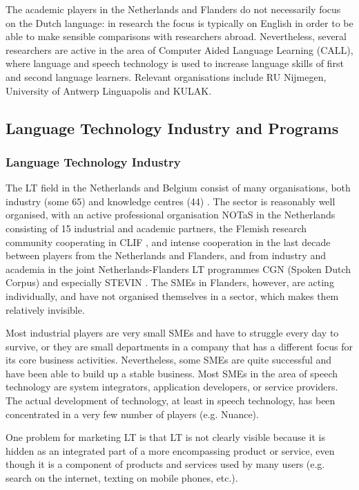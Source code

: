 \documentclass[]{../../metanetpaper}
\begin{document}
\begin{multicols}{2}
    The academic players in the Netherlands and Flanders do not necessarily focus on the Dutch language: in research the focus is typically on English in order to be able to make sensible comparisons with researchers abroad. Nevertheless, several researchers are active in the area of Computer Aided Language Learning (CALL), where language and speech technology is used to increase language skills of first and second language learners. Relevant organisations include RU Nijmegen, University of Antwerp Linguapolis and KULAK.
  
\subsection{Language Technology Industry and Programs}

  \subsubsection{Language Technology Industry}

 The LT field in the Netherlands and Belgium consist of many organisations, both industry (some 65) and knowledge centres (44) \cite{Orgs}.  The sector is reasonably well organised, with an active professional organisation NOTaS \cite{NOTAS} in the Netherlands consisting of 15 industrial and academic partners, the Flemish research community cooperating in CLIF \cite{CLIF}, and intense cooperation in the last decade between players from the Netherlands and Flanders, and from industry and academia in the joint Netherlands-Flanders LT programmes CGN (Spoken Dutch Corpus) \cite{CGN} and especially STEVIN \cite{STEVIN}. The SMEs in Flanders, however, are acting individually, and have not organised themselves in a sector, which makes them relatively invisible.

    Most industrial players are very small SMEs and have to struggle every day to survive, or they are small departments in a company that has a different focus for its core business activities. Nevertheless, some SMEs are quite successful and have been able to build up a stable business. Most SMEs in the area of speech technology are system integrators, application developers, or service providers. The actual development of technology, at least in speech technology, has been concentrated in a very few number of players (e.g. Nuance).

    One problem for marketing LT is that LT is not clearly visible because it is hidden as an integrated part of a more encompassing product or service, even though it is a component of products and services used by many users (e.g. search on the internet, texting on mobile phones, etc.).


\end{multicols}
\end{document}
